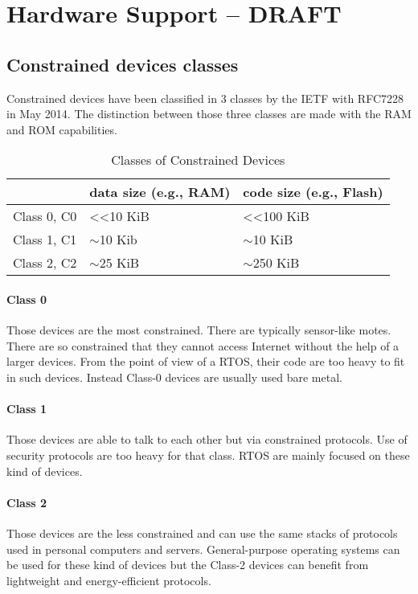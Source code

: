 \section{Hardware Support -- DRAFT}

\subsection{Constrained devices classes}

Constrained devices have been classified in 3 classes by the IETF with RFC7228 in May 2014. The distinction between those three classes are made with the RAM and ROM capabilities.

\begin{table}[!h]
  \centering
  \begin{tabular}{|l|l|l|}
  \hline
   & data size (e.g., RAM) & code size (e.g., Flash) \\ \hline
  Class 0, C0 & \textless{}\textless 10 KiB & \textless{}\textless 100 KiB \\ %
  Class 1, C1 & $\sim$10 Kib & $\sim$10 KiB \\ %
  Class 2, C2 & $\sim$25 KiB & $\sim$250 KiB \\ \hline
  \end{tabular}
  \caption{Classes of Constrained Devices}
  \label{constrained-devices-classes}
\end{table}

\paragraph{Class 0}
Those devices are the most constrained.
There are typically sensor-like motes.
There are so constrained that they cannot access Internet without the help of a larger devices.
From the point of view of a RTOS, their code are too heavy to fit in such devices.
Instead Class-0 devices are usually used bare metal. %

\paragraph{Class 1}
Those devices are able to talk to each other but via constrained protocols.
Use of security protocols are too heavy for that class.
RTOS are mainly focused on these kind of devices.

\paragraph{Class 2}
Those devices are the less constrained and can use the same stacks of protocols used in personal computers and servers.
General-purpose operating systems can be used for these kind of devices but the Class-2 devices can benefit from lightweight and energy-efficient protocols.

